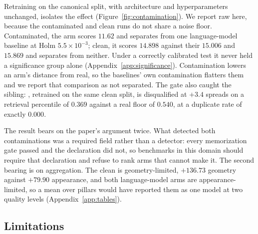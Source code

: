 Retraining \voxar{} on the canonical split, with architecture and hyperparameters
unchanged, isolates the effect (Figure~\ref{fig:contamination}). We report raw \vkid{} here,
because the contaminated and clean runs do not share a noise floor. Contaminated, the arm
scores $11.62$ and separates from one language-model baseline at Holm
$5.5{\times}10^{-3}$; clean, it scores $14.898$ against their $15.006$ and $15.869$ and
separates from neither. Under a correctly calibrated test it never held a significance group
alone (Appendix~\ref{app:significance}). Contamination lowers an arm's distance from real,
so the baselines' own contamination flatters them and we report that comparison as not
separated. The gate also caught the sibling: \voxarun{}, retrained on the same clean split,
is disqualified at $+3.4$ spreads on a retrieval percentile of $0.369$ against a real floor
of $0.540$, at a duplicate rate of exactly $0.000$.

The result bears on the paper's argument twice. What detected both contaminations was a
required field rather than a detector: every memorization gate passed and the declaration
did not, so benchmarks in this domain should require that declaration and refuse to rank
arms that cannot make it. The second bearing is on aggregation. The clean \voxar{} is
geometry-limited, $+136.73$ geometry against $+79.90$ appearance, and both language-model
arms are appearance-limited, so a mean over pillars would have reported them as one model
at two quality levels (Appendix~\ref{app:tables}).

\subsection{Limitations}
\label{sec:limitations}


